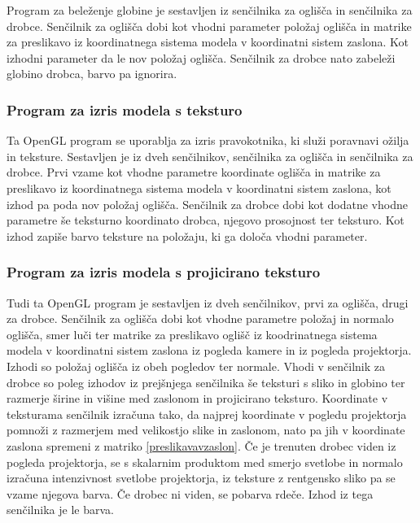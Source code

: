 \documentclass[a4paper, 12pt]{book}
\begin{document}
Program za beleženje globine je sestavljen iz senčilnika za oglišča in senčilnika za drobce. Senčilnik za oglišča dobi kot vhodni parameter položaj oglišča in matrike za preslikavo iz koordinatnega sistema modela v koordinatni sistem zaslona. Kot izhodni parameter da le nov položaj oglišča. Senčilnik za drobce nato zabeleži globino drobca, barvo pa ignorira.

\subsubsection*{Program za izris modela s teksturo}

Ta OpenGL program se uporablja za izris pravokotnika, ki služi poravnavi ožilja in teksture. Sestavljen je iz dveh senčilnikov, senčilnika za oglišča in senčilnika za drobce. Prvi vzame kot vhodne parametre koordinate oglišča in matrike za preslikavo iz koordinatnega sistema modela v koordinatni sistem zaslona, kot izhod pa poda nov položaj oglišča. Senčilnik za drobce dobi kot dodatne vhodne parametre še teksturno koordinato drobca, njegovo prosojnost ter teksturo. Kot izhod zapiše barvo teksture na položaju, ki ga določa vhodni parameter.

\subsubsection*{Program za izris modela s projicirano teksturo}

Tudi ta OpenGL program je sestavljen iz dveh senčilnikov, prvi za oglišča, drugi za drobce. Senčilnik za oglišča dobi kot vhodne parametre položaj in normalo oglišča, smer luči ter matrike za preslikavo oglišč iz koodrinatnega sistema modela v koordinatni sistem zaslona iz pogleda kamere in iz pogleda projektorja. Izhodi so položaj oglišča iz obeh pogledov ter normale. Vhodi v senčilnik za drobce so poleg izhodov iz prejšnjega senčilnika še teksturi s sliko in globino ter razmerje širine in višine med zaslonom in projicirano teksturo. Koordinate v teksturama senčilnik izračuna tako, da najprej koordinate v pogledu projektorja pomnoži z razmerjem med velikostjo slike in zaslonom, nato pa jih v koordinate zaslona spremeni z matriko \ref{preslikavavzaslon}. Če je trenuten drobec viden iz pogleda projektorja, se s skalarnim produktom med smerjo svetlobe in normalo izračuna intenzivnost svetlobe projektorja, iz teksture z rentgensko sliko pa se vzame njegova barva. Če drobec ni viden, se pobarva rdeče. Izhod iz tega senčilnika je le barva.
\end{document}
